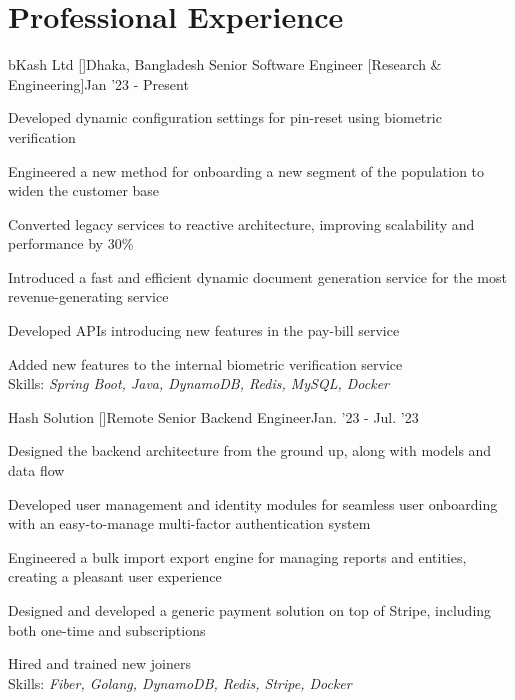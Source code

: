 
\section{\textbf{Professional Experience}}
\vspace{-0.4mm}
  \resumeSubHeadingListStart
  \resumeSubheading
      {{bKash Ltd [\href{https://www.bkash.com/en}{}]}}{Dhaka, Bangladesh}
      {Senior Software Engineer [Research \& Engineering]}{Jan '23 - {Present}}
      \resumeItemListStart
        \item Developed dynamic configuration settings for pin-reset using biometric verification
        \item Engineered a new method for onboarding a new segment of the population to widen the customer base
        \item Converted legacy services to reactive architecture, improving scalability and performance by 30\%
        \item Introduced a fast and efficient dynamic document generation service for the most revenue-generating service
        \item Developed APIs introducing new features in the pay-bill service
        \item Added new features to the internal biometric verification service 
        {\\Skills: \emph{Spring Boot, Java, DynamoDB, Redis, MySQL, Docker}}
      \resumeItemListEnd 
     

  \resumeSubheading
    {Hash Solution [\href{https://www.linkedin.com/company/hashsolution/}{}]}{Remote}
    {Senior Backend Engineer}{Jan. '23 - Jul. '23}
    \resumeItemListStart
      \item Designed the backend architecture from the ground up, along with models and data flow
      \item Developed user management and identity modules for seamless user onboarding with an easy-to-manage multi-factor authentication system
      \item Engineered a bulk import export engine for managing reports and entities, creating a pleasant user experience
      \item Designed and developed a generic payment solution on top of Stripe, including both one-time and subscriptions
      \item Hired and trained new joiners
      {\\Skills: \emph{Fiber, Golang, DynamoDB, Redis, Stripe, Docker}}
    \resumeItemListEnd

